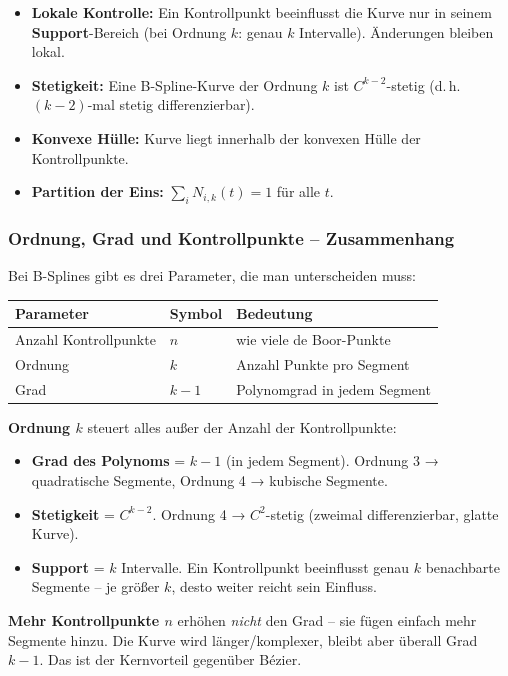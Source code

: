 \documentclass[12pt, a4paper]{article}
\begin{document}
\begin{itemize}
  \item \textbf{Lokale Kontrolle:} Ein Kontrollpunkt beeinflusst die Kurve nur in seinem \textbf{Support}-Bereich (bei Ordnung $k$: genau $k$ Intervalle). Änderungen bleiben lokal.
  \item \textbf{Stetigkeit:} Eine B-Spline-Kurve der Ordnung $k$ ist $C^{k-2}$-stetig (d.\,h.\ $(k{-}2)$-mal stetig differenzierbar).
  \item \textbf{Konvexe Hülle:} Kurve liegt innerhalb der konvexen Hülle der Kontrollpunkte.
  \item \textbf{Partition der Eins:} $\sum_i N_{i,k}(t) = 1$ für alle $t$.
\end{itemize}

\subsubsection*{Ordnung, Grad und Kontrollpunkte -- Zusammenhang}

Bei B-Splines gibt es drei Parameter, die man unterscheiden muss:

\begin{center}
\begin{tabular}{lll}
  \textbf{Parameter} & \textbf{Symbol} & \textbf{Bedeutung} \\
  \hline
  Anzahl Kontrollpunkte & $n$ & wie viele de Boor-Punkte \\
  Ordnung & $k$ & Anzahl Punkte pro Segment \\
  Grad & $k-1$ & Polynomgrad in jedem Segment \\
\end{tabular}
\end{center}

\textbf{Ordnung $k$} steuert alles außer der Anzahl der Kontrollpunkte:
\begin{itemize}
  \item \textbf{Grad des Polynoms} = $k-1$ (in jedem Segment). Ordnung 3 → quadratische Segmente, Ordnung 4 → kubische Segmente.
  \item \textbf{Stetigkeit} = $C^{k-2}$. Ordnung 4 → $C^2$-stetig (zweimal differenzierbar, glatte Kurve).
  \item \textbf{Support} = $k$ Intervalle. Ein Kontrollpunkt beeinflusst genau $k$ benachbarte Segmente -- je größer $k$, desto weiter reicht sein Einfluss.
\end{itemize}

\textbf{Mehr Kontrollpunkte $n$} erhöhen \textit{nicht} den Grad -- sie fügen einfach mehr Segmente hinzu. Die Kurve wird länger/komplexer, bleibt aber überall Grad $k-1$. Das ist der Kernvorteil gegenüber Bézier.
\end{document}
